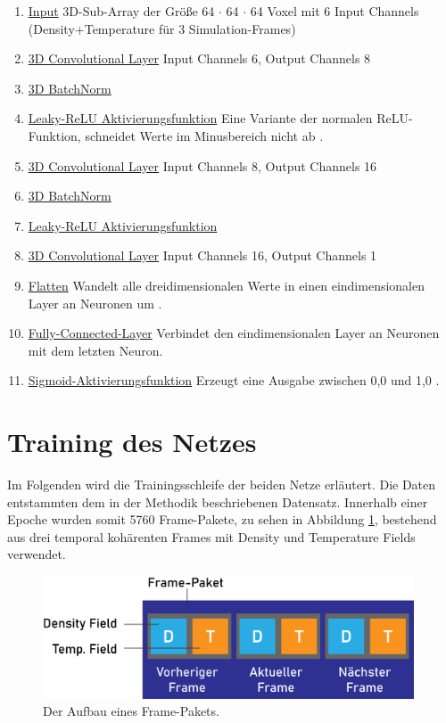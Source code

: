 \begin{enumerate}
    \item \underline{Input} 3D-Sub-Array der Größe 64 $\cdot$ 64 $\cdot$ 64 Voxel mit 6 Input Channels (Density+Temperature für 3 Simulation-Frames)
    \item \underline{3D Convolutional Layer} Input Channels 6, Output Channels 8
    \item \underline{3D BatchNorm}
    \item \underline{Leaky-ReLU Aktivierungsfunktion} Eine Variante der normalen ReLU-Funktion, schneidet Werte im Minusbereich nicht ab \parencite[]{liu-2019}.
    \item \underline{3D Convolutional Layer} Input Channels 8, Output Channels 16
    \item \underline{3D BatchNorm}
    \item \underline{Leaky-ReLU Aktivierungsfunktion}
    \item \underline{3D Convolutional Layer} Input Channels 16, Output Channels 1
    \item \underline{Flatten} Wandelt alle dreidimensionalen Werte in einen eindimensionalen Layer an Neuronen um \parencite[]{meta-aiflatten}.
    \item \underline{Fully-Connected-Layer} Verbindet den eindimensionalen Layer an Neuronen mit dem letzten Neuron.
    \item \underline{Sigmoid-Aktivierungsfunktion} Erzeugt eine Ausgabe zwischen 0,0 und 1,0 \parencite[]{wood-2020}.
    \end{enumerate}


\section{Training des Netzes}
Im Folgenden wird die Trainingsschleife der beiden Netze erläutert. Die Daten entstammten dem in der Methodik beschriebenen Datensatz. Innerhalb einer Epoche wurden somit 5760 Frame-Pakete, zu sehen in Abbildung \ref{paket}, bestehend aus drei temporal kohärenten Frames mit Density und Temperature Fields verwendet. \\

\begin{figure}[ht]
    \centering
    \includegraphics[width=11cm]{bilder/framepaket.jpg}
    \caption{Der Aufbau eines Frame-Pakets.}
    \label{paket}
\end{figure}

